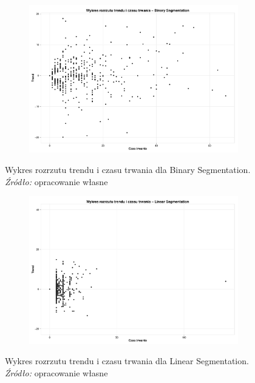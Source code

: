 \documentclass[polish, twoside, 12pt, a4paper]{article}
\theoremstyle{definition}
\theoremstyle{plain}
\theoremstyle{remark}
\begin{document}
\begin{figure}[H]
  \centering

  \begin{subfigure}[t]{1.00\textwidth}
    \includegraphics[width=\textwidth]{./rys010}
  \end{subfigure}

  \captionsetup{margin=10pt,font=small,labelfont=bf,width=.8\textwidth}

  \caption[Wykres rozrzutu trendu i czasu trwania dla Binary Segmentation]{Wykres rozrzutu trendu i czasu trwania dla Binary Segmentation. \textit{Źródło:} opracowanie własne}\label{rys010}
\end{figure}

\begin{figure}[H]
  \centering

  \begin{subfigure}[t]{1.00\textwidth}
    \includegraphics[width=\textwidth]{./rys011}
  \end{subfigure}

  \captionsetup{margin=10pt,font=small,labelfont=bf,width=.8\textwidth}

  \caption[Wykres rozrzutu trendu i czasu trwania dla Linear Segmentation]{Wykres rozrzutu trendu i czasu trwania dla Linear Segmentation. \textit{Źródło:} opracowanie własne}\label{rys011}
\end{figure}
\end{document}
